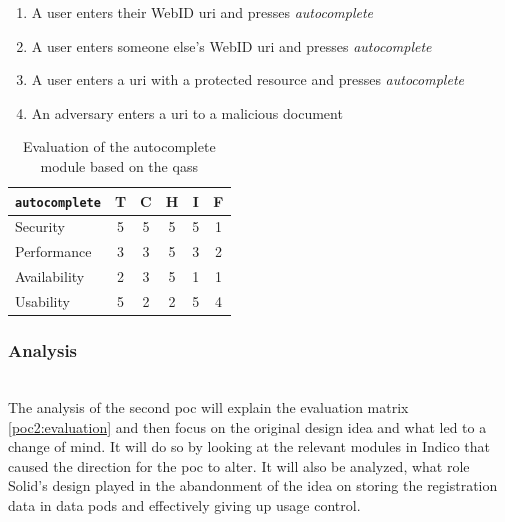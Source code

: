 \begin{enumerate}
    \item A user enters their WebID \gls{uri} and presses \textit{autocomplete}
    \item A user enters someone else's WebID \gls{uri} and presses \textit{autocomplete}
    \item A user enters a \gls{uri} with a protected resource and presses \textit{autocomplete}
    \item An adversary enters a \gls{uri} to a malicious document
\end{enumerate}

\begin{table}[h!]
    \centering
    \begin{tabular}{| l | c | c | c | c | c |} 
     \hline
     \texttt{autocomplete} & T & C & H & I & F \\
     \hline
     Security & 5 & 5 & 5 & 5 & \cellcolor{green!25}1\\
     \hline
     Performance & 3 & 3 & 5 & 3 & \cellcolor{green!25}2\\
     \hline
     Availability & 2 & 3 & 5 & 1 & \cellcolor{green!25}1\\
     \hline
     Usability & 5 & 2 & 2 & 5 & \cellcolor{red!25}4\\
     \hline
    \end{tabular}
    \vspace{0.75cm}
    \caption{Evaluation of the autocomplete module based on the \glspl{qas}}
    \label{table:poc2-evaluation}
\end{table}
\subsubsection{Analysis}\label{poc2:analysis}\mbox{}\\

The analysis of the second \gls{poc} will explain the evaluation matrix \ref{poc2:evaluation} and then focus on the original design idea and what led to a change of mind. It will do so by looking at the relevant modules in Indico that caused the direction for the \gls{poc} to alter. It will also be analyzed, what role Solid's design played in the abandonment of the idea on storing the registration data in data pods and effectively giving up usage control.

\vspace{0.5cm}

